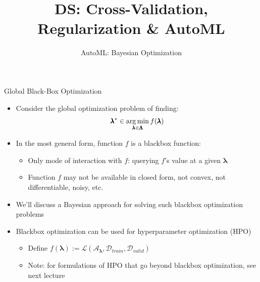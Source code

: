 \documentclass[aspectratio=169]{../latex_main/tntbeamer}  %
\title[CV, Reg \& AutoML]{DS: Cross-Validation, Regularization \& AutoML}
\subtitle{AutoML: Bayesian Optimization}
\newcommand{\pcs}[0]{\pmb{\Lambda}}
\newcommand{\conf}[0]{\pmb{\lambda}}
\newcommand{\confs}[0]{\pcs}
\begin{document}
\maketitle

\begin{frame}[c]{Global Black-Box Optimization}
    
    \begin{itemize}
        \item Consider the \alert{global optimization problem} of finding: 
        \[\conf^* \in \argmin_{\conf \in \confs} f(\conf)\]
        
\pause
        \item In the most general form, function $f$ is a \alert{blackbox function}:
    	
    	\begin{center}
\scalebox{0.5}{}
    	\end{center}

    
   \begin{itemize}
    	\item Only mode of interaction with $f$: querying $f$'s value at a given $\conf$ 
        \item Function $f$ may not be available in closed form, not convex, not differentiable, noisy, etc. 
   \end{itemize}
\medskip
\pause

        \item We'll discuss a \alert{Bayesian} approach for solving such blackbox optimization problems
\medskip
\pause
        \item Blackbox optimization can be used for hyperparameter optimization (HPO)
   	 	\begin{itemize}
         	\item Define \alert{$f(\conf) := \mathcal{L}( \mathcal{A}_{\conf}, \mathcal{D}_{train}, \mathcal{D}_{valid} )$}
        	\item Note: for formulations of HPO that go beyond blackbox optimization, see next lecture
        \end{itemize}
    \end{itemize}
\end{frame}
\end{document}
